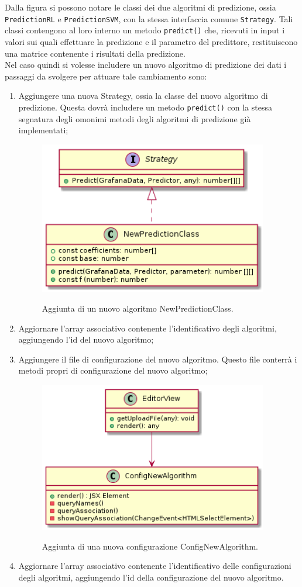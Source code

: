\documentclass[../manuale-sviluppatore.tex]{subfiles}
\begin{document}
Dalla figura si possono notare le classi dei due algoritmi di predizione, ossia \texttt{PredictionRL} e \texttt{PredictionSVM}, con la stessa interfaccia comune \texttt{Strategy}.
Tali classi contengono al loro interno un metodo \texttt{predict()} che, ricevuti in input i valori sui quali effettuare la predizione e il parametro del predittore, restituiscono una matrice contenente i risultati della predizione. \\
Nel caso quindi si volesse includere un nuovo algoritmo di predizione dei dati i passaggi da svolgere per attuare tale cambiamento sono:
\begin{enumerate}
  \item Aggiungere una nuova Strategy, ossia la classe del nuovo algoritmo di predizione. Questa dovrà includere un metodo \texttt{predict()} con la stessa segnatura degli omonimi metodi degli algoritmi di predizione già implementati;
  \begin{figure}[H]
    \centering
    \includegraphics[width=10cm]{img/plugin/newstrategy.png}
    \label{fig:scice_documenti}
    \caption{Aggiunta di un nuovo algoritmo NewPredictionClass.}
  \end{figure}
  \item Aggiornare l'array associativo contenente l'identificativo degli algoritmi, aggiungendo l'id del nuovo algoritmo;
  \item Aggiungere il file di configurazione del nuovo algoritmo. Questo file conterrà i metodi propri di configurazione del nuovo algoritmo;
  \begin{figure}[H]
    \centering
    \includegraphics[width=10cm]{img/plugin/newconfig.png}
    \label{fig:scice_documenti}
    \caption{Aggiunta di una nuova configurazione ConfigNewAlgorithm.}
  \end{figure}
  \item Aggiornare l'array associativo contenente l'identificativo delle configurazioni degli algoritmi, aggiungendo l'id della configurazione del nuovo algoritmo.
\end{enumerate}
\end{document}
